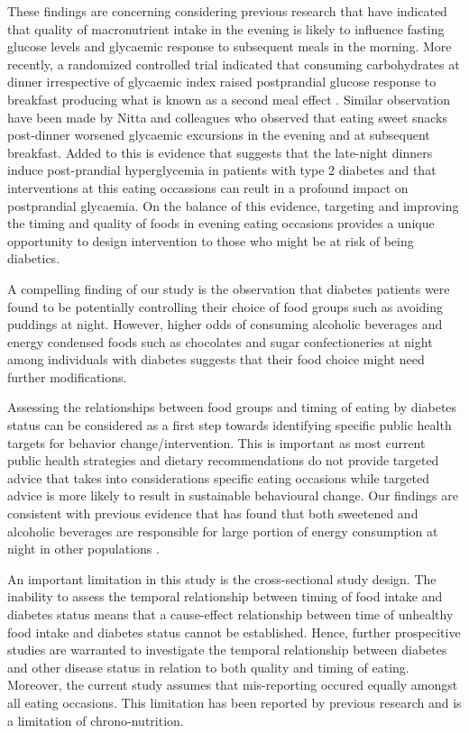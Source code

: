 \documentclass{bmcart}
\begin{document}
These findings are concerning considering previous research that have indicated that quality of macronutrient intake in the evening is likely to influence fasting glucose levels and glycaemic response to subsequent meals in the morning. \cite{Wolever1988} More recently, a randomized controlled trial indicated that consuming carbohydrates at dinner irrespective of glycaemic index raised postprandial glucose response to breakfast producing what is known as a second meal effect \cite{Haldar2020}. Similar observation have been made by Nitta and colleagues who observed that eating sweet snacks post-dinner worsened glycaemic excursions in the evening and at subsequent breakfast. \cite{Nitta2019} Added to this is evidence that suggests that the late-night dinners induce post-prandial hyperglycemia in patients with type 2 diabetes and that interventions at this eating occassions can reult in a profound impact on postprandial glycaemia. On the balance of this evidence, targeting and improving the timing and quality of foods in evening eating occasions provides a unique opportunity to design intervention to those who might be at risk of being diabetics. 


A compelling finding of our study is the observation that diabetes patients were found to be potentially controlling their choice of food groups such as avoiding puddings at night. However, higher odds of consuming alcoholic beverages and energy condensed foods such as chocolates and sugar confectioneries at night among individuals with diabetes suggests that their food choice might need further modifications. 

Assessing the relationships between food groups and timing of eating by diabetes status can be considered as a first step towards identifying specific public health targets for behavior change/intervention. This is important as most current public health strategies and dietary recommendations do not provide targeted advice that takes into considerations specific eating occasions while targeted advice is more likely to result in sustainable behavioural change. Our findings are consistent with previous evidence that has found that both sweetened and alcoholic beverages are responsible for large portion of energy consumption at night in other populations \cite{Hassen2018}. 


An important limitation in this study is the cross-sectional study design. The inability to assess the temporal relationship between timing of food intake and diabetes status means that a cause-effect relationship between time of unhealthy food intake and diabetes status cannot be established. Hence, further prospecitive studies are warranted to investigate the temporal relationship between diabetes and other disease status in relation to both quality and timing of eating. Moreover, the current study assumes that mis-reporting occured equally amongst all eating occasions. This limitation has been reported by previous research and is a limitation of chrono-nutrition. \cite{FayetMoore2017}
\end{document}
